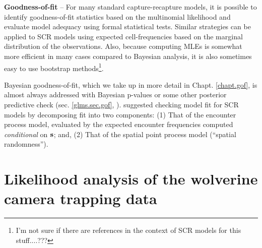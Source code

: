 {\bf Goodness-of-fit} -- For many standard capture-recapture models,
it is possible to identify goodness-of-fit statistics based on the
multinomial likelihood and evaluate model adequacy using formal
statistical tests. Similar strategies can be applied to SCR models
using expected cell-frequencies based on the marginal distribution of
the observations. Also, because computing MLEs is somewhat more
efficient in many cases compared to Bayesian analysis, it is also
sometimes easy to use bootstrap methods\footnote{I'm not sure if there
  are references in the context of SCR models for this stuff....???}.

Bayesian goodness-of-fit, which we take up in more detail in
Chapt. \ref{chapt.gof}, is almost always addressed with Bayesian
p-values or some other posterior predictive check
(sec. \ref{glms.sec.gof}, \citet[][sec. 2.6]{kery:2010}).
\citet{royle_etal:2011mee} suggested checking model fit for SCR models
by decomposing fit into two components: (1) That of the encounter
process model, evaluated by the expected encounter frequencies
computed {\it conditional} on ${\bf s}$; and, (2) That of the spatial
point process model (``spatial randomness'').


\section{Likelihood analysis of the wolverine camera trapping data}
\label{mle.sec.wolverine}


